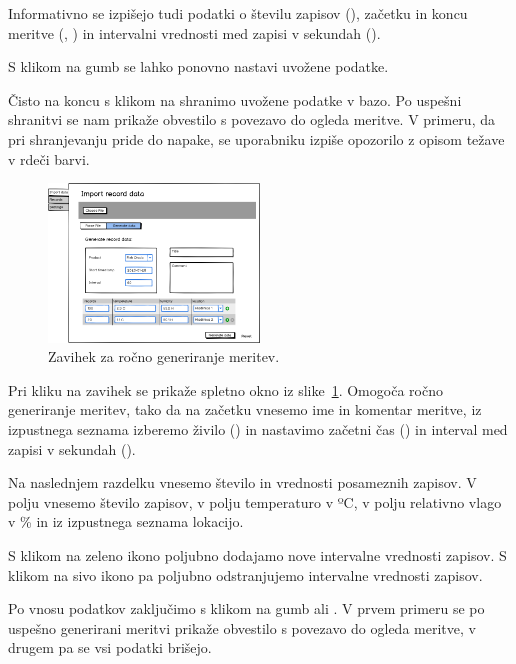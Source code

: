 \documentclass[a4paper, 12pt]{book}
\begin{document}
Informativno se izpišejo tudi podatki o številu zapisov (), začetku in koncu meritve (, ) in intervalni vrednosti med zapisi v sekundah (). 

S klikom na gumb  se lahko ponovno nastavi uvožene podatke.

Čisto na koncu s klikom na  shranimo uvožene podatke v bazo. Po uspešni shranitvi se nam prikaže obvestilo s povezavo do ogleda meritve. V primeru, da pri shranjevanju pride do napake, se uporabniku izpiše opozorilo z opisom težave v rdeči barvi.

\begin{figure}[h]
\begin{center}
\includegraphics[width=0.5\textwidth]{slike/Import-data-Generate.png}
\end{center}
\caption{Zavihek  za ročno generiranje meritev.}
\label{generate-data-wireframe}
\end{figure}

Pri kliku na zavihek  se prikaže spletno okno iz slike~\ref{generate-data-wireframe}. Omogoča ročno generiranje meritev, tako da na začetku vnesemo ime in komentar meritve, iz izpustnega seznama izberemo živilo () in nastavimo začetni čas () in interval med zapisi v sekundah ().

Na naslednjem razdelku vnesemo število in vrednosti posameznih zapisov. V polju  vnesemo število zapisov, v polju  temperaturo v ºC, v polju  relativno vlago v \% in iz izpustnega seznama  lokacijo.

S klikom na zeleno ikono  poljubno dodajamo nove intervalne vrednosti zapisov. 
S klikom na sivo ikono  pa poljubno odstranjujemo intervalne vrednosti zapisov.

Po vnosu podatkov zaključimo s klikom na gumb  ali . V prvem primeru se po uspešno generirani meritvi prikaže obvestilo s povezavo do ogleda meritve, v drugem pa se vsi podatki brišejo.
\end{document}
